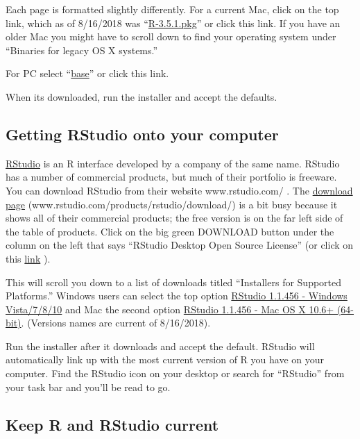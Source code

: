 \documentclass[
]{book}
\begin{document}
Each page is formatted slightly differently. For a current Mac, click on the top link, which as of 8/16/2018 was ``\href{https://cran.r-project.org/bin/macosx/R-3.5.1.pkg}{R-3.5.1.pkg}'' or click this link. If you have an older Mac you might have to scroll down to find your operating system under ``Binaries for legacy OS X systems.''

For PC select ``\href{https://cran.r-project.org/bin/windows/base/}{base}'' or click this link.

When its downloaded, run the installer and accept the defaults.

\hypertarget{getting-rstudio-onto-your-computer}{%
\subsection{Getting RStudio onto your computer}\label{getting-rstudio-onto-your-computer}}

\href{www.rstudio.com/}{RStudio} is an R interface developed by a company of the same name. RStudio has a number of commercial products, but much of their portfolio is freeware. You can download RStudio from their website www.rstudio.com/ . The \href{https://www.rstudio.com/products/rstudio/download/}{download page} (www.rstudio.com/products/rstudio/download/) is a bit busy because it shows all of their commercial products; the free version is on the far left side of the table of products. Click on the big green DOWNLOAD button under the column on the left that says ``RStudio Desktop Open Source License'' (or click on this \href{https://www.rstudio.com/products/rstudio/download/\#download}{link} ).

This will scroll you down to a list of downloads titled ``Installers for Supported Platforms.'' Windows users can select the top option \href{https://download1.rstudio.org/RStudio-1.1.456.exe}{RStudio 1.1.456 - Windows Vista/7/8/10} and Mac the second option \href{https://download1.rstudio.org/RStudio-1.1.456.dmg}{RStudio 1.1.456 - Mac OS X 10.6+ (64-bit)}. (Versions names are current of 8/16/2018).

Run the installer after it downloads and accept the default. RStudio will automatically link up with the most current version of R you have on your computer. Find the RStudio icon on your desktop or search for ``RStudio'' from your task bar and you'll be read to go.

\hypertarget{keep-r-and-rstudio-current}{%
\subsection{Keep R and RStudio current}\label{keep-r-and-rstudio-current}}
\end{document}
